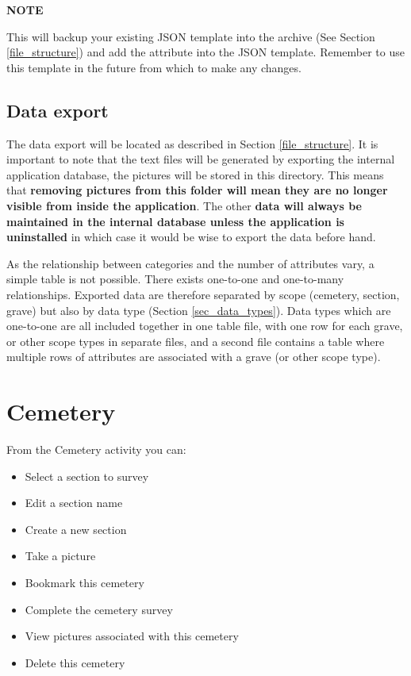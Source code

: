 \documentclass{scrreprt}
\begin{document}
\textbf{NOTE}

This will backup your existing JSON template into the archive (See Section \ref{file_structure}) and add the attribute into the JSON template. Remember to use this template in the future from which to make any changes.

\subsection{Data export}
The data export will be located as described in Section \ref{file_structure}. It is important to note that the text files will be generated by exporting the internal application database, the pictures will be stored in this directory. This means that \textbf{removing pictures from this folder will mean they are no longer visible from inside the application}. The other \textbf{data will always be maintained in the internal database unless the application is uninstalled} in which case it would be wise to export the data before hand.

As the relationship between categories and the number of attributes vary, a simple table is not possible. There exists one-to-one and one-to-many relationships. Exported data are therefore separated by scope (cemetery, section, grave) but also by data type (Section \ref{sec_data_types}). Data types which are one-to-one are all included together in one table file, with one row for each grave, or other scope types in separate files, and a second file contains a table where multiple rows of attributes are associated with a grave (or other scope type).

\section{Cemetery}
From the Cemetery activity you can:
\begin{itemize}
\item Select a section to survey
\item Edit a section name
\item Create a new section
\item Take a picture
\item Bookmark this cemetery
\item Complete the cemetery survey
\item View pictures associated with this cemetery
\item Delete this cemetery
\end{itemize}
\end{document}
